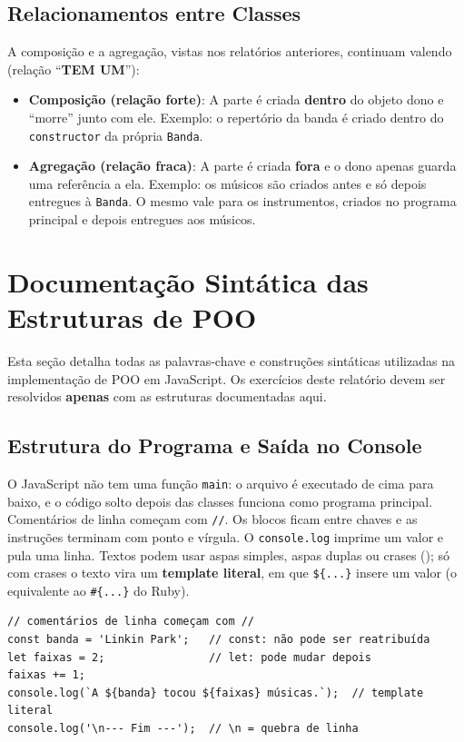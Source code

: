 \subsection{Relacionamentos entre Classes}

A composição e a agregação, vistas nos relatórios anteriores, continuam valendo (relação
``\textbf{TEM UM}''):

\begin{itemize}
    \item \textbf{Composição (relação forte)}: A parte é criada \textbf{dentro} do objeto dono e
    ``morre'' junto com ele. Exemplo: o repertório da banda é criado dentro do
    \texttt{constructor} da própria \texttt{Banda}.

    \item \textbf{Agregação (relação fraca)}: A parte é criada \textbf{fora} e o dono apenas
    guarda uma referência a ela. Exemplo: os músicos são criados antes e só depois entregues à
    \texttt{Banda}. O mesmo vale para os instrumentos, criados no programa principal e depois
    entregues aos músicos.
\end{itemize}

\section{Documentação Sintática das Estruturas de POO}

Esta seção detalha todas as palavras-chave e construções sintáticas utilizadas na implementação
de POO em JavaScript. Os exercícios deste relatório devem ser resolvidos \textbf{apenas} com as
estruturas documentadas aqui.

\subsection{Estrutura do Programa e Saída no Console}

O JavaScript não tem uma função \texttt{main}: o arquivo é executado de cima para baixo, e o
código solto depois das classes funciona como programa principal. Comentários de linha começam
com \texttt{//}. Os blocos ficam entre chaves e as instruções terminam com ponto e vírgula. O
\texttt{console.log} imprime um valor e pula uma linha. Textos podem usar aspas simples, aspas
duplas ou crases (\textasciigrave); só com crases o texto vira um \textbf{template literal}, em
que \texttt{\$\{...\}} insere um valor (o equivalente ao \texttt{\#\{...\}} do Ruby).

\begin{lstlisting}[style=javascript]
// comentários de linha começam com //
const banda = 'Linkin Park';   // const: não pode ser reatribuída
let faixas = 2;                // let: pode mudar depois
faixas += 1;
console.log(`A ${banda} tocou ${faixas} músicas.`);  // template literal
console.log('\n--- Fim ---');  // \n = quebra de linha
\end{lstlisting}

